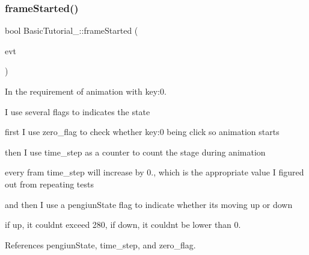 \subsubsection{\texorpdfstring{frame\+Started()}{frameStarted()}}
{\footnotesize\ttfamily bool Basic\+Tutorial\+\_\+::frame\+Started (\begin{DoxyParamCaption}\item[{const Ogre\+::\+Frame\+Event \&}]{evt }\end{DoxyParamCaption})\hspace{0.3cm}{\ttfamily [virtual]}}



In the requirement of animation with key\+:0. 

I use several flags to indicates the state

first I use zero\+\_\+flag to check whether key\+:0 being click so animation starts

then I use time\+\_\+step as a counter to count the stage during animation

every fram time\+\_\+step will increase by 0., which is the appropriate value I figured out from repeating tests

and then I use a pengiun\+State flag to indicate whether its moving up or down

if up, it couldnt exceed 280, if down, it couldnt be lower than 0. 

References pengiun\+State, time\+\_\+step, and zero\+\_\+flag.


